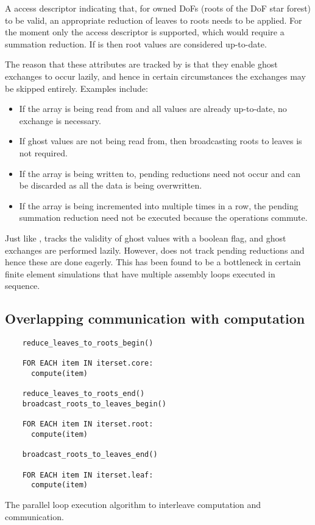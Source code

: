 \documentclass[thesis]{subfiles}
\begin{document}
\begin{paragraph}{}
  A  access descriptor indicating that, for owned DoFs (roots of the DoF star forest) to be valid, an appropriate reduction of leaves to roots needs to be applied.
  For the moment only the  access descriptor is supported, which would require a summation reduction.
  If  is  then root values are considered up-to-date.
\end{paragraph}

The reason that these attributes are tracked by  is that they enable ghost exchanges to occur lazily, and hence in certain circumstances the exchanges may be skipped entirely.
Examples include:

\begin{itemize}
  \item If the array is being read from and all values are already up-to-date, no exchange is necessary.
  \item If ghost values are not being read from, then broadcasting roots to leaves is not required.
  \item If the array is being written to, pending reductions need not occur and can be discarded as all the data is being overwritten.
  \item If the array is being incremented into multiple times in a row, the pending summation reduction need not be executed because the operations commute.
\end{itemize}

\begin{pyopcompare}
  Just like ,  tracks the validity of ghost values with a boolean flag, and ghost exchanges are performed lazily.
  However,  does not track pending reductions and hence these are done eagerly.
  This has been found to be a bottleneck in certain finite element simulations that have multiple assembly loops executed in sequence.
\end{pyopcompare}

\subsection{Overlapping communication with computation}

\begin{algorithm}
  \begin{verbatim}
    reduce_leaves_to_roots_begin()

    FOR EACH item IN iterset.core:
      compute(item)

    reduce_leaves_to_roots_end()
    broadcast_roots_to_leaves_begin()

    FOR EACH item IN iterset.root:
      compute(item)

    broadcast_roots_to_leaves_end()

    FOR EACH item IN iterset.leaf:
      compute(item)
  \end{verbatim}
  \caption{The  parallel loop execution algorithm to interleave computation and communication.}
  \label{alg:pyop3_comp_comm_overlap}
\end{algorithm}
\end{document}
